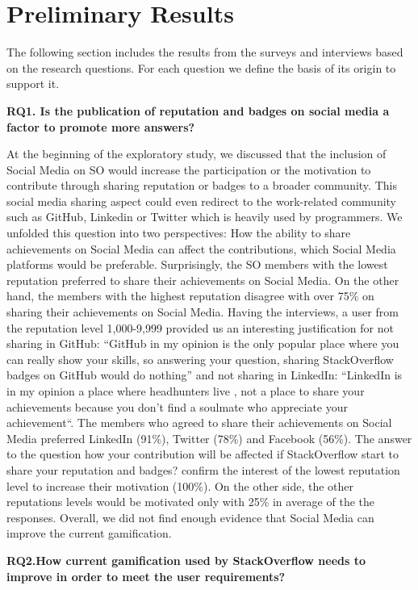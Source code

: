 \documentclass{sigchi}
\begin{document}
\section{Preliminary Results}

The following section includes the results from the surveys and interviews based on the research questions. For each question we define the basis of its origin to support it.

\textbf{RQ1. Is the publication of reputation and badges on social media a factor to promote more answers?}

At the beginning of the exploratory study, we discussed that the inclusion of Social Media on SO would increase the participation or the motivation to contribute through sharing reputation or badges to a broader community. This social media sharing aspect could even redirect to the work-related community such as GitHub, Linkedin or Twitter which is heavily used by programmers. We unfolded this question into two perspectives: How the ability to share achievements on Social Media can affect the contributions,  which Social Media platforms would be preferable. Surprisingly, the SO members with the lowest reputation preferred to share their achievements on Social Media. On the other hand, the members with the highest reputation disagree with over 75\% on sharing their achievements on Social Media. Having the interviews, a user from the reputation level 1,000-9,999 provided us an interesting justification for not sharing in GitHub: “GitHub in my opinion is the only popular place where you can really show your skills, so answering your question, sharing StackOverflow badges on GitHub would do nothing” and not sharing in LinkedIn: “LinkedIn is in my opinion a place where headhunters live , not a place to share your achievements because you don’t find a soulmate who appreciate your achievement“. The members who agreed to share their achievements on Social Media preferred LinkedIn (91\%), Twitter (78\%) and Facebook (56\%). The answer to the question how your contribution will be affected if StackOverflow start to share your reputation and badges? confirm the interest of the lowest reputation level to increase their motivation (100\%). On the other side, the other reputations levels would be motivated only with 25\% in average of the the responses. Overall, we did not find enough evidence that Social Media can improve the current gamification. 

\textbf{RQ2.How current gamification used by StackOverflow needs to improve in order to meet the user requirements?}
\end{document}
